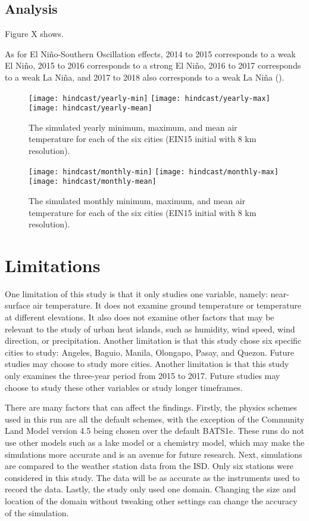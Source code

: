 	\subsection{Analysis}
		Figure X shows.
		
		As for El Niño-Southern Oscillation effects,
			2014 to 2015 corresponds to a weak El Niño,
			2015 to 2016 corresponds to a strong El Niño,
			2016 to 2017 corresponds to a weak La Niña,
			and
			2017 to 2018 also corresponds to a weak La Niña
			(\cite{Null2025}).
		
		\begin{figure}	
			\centering
			\texttt{[image: hindcast/yearly-min]}
			\texttt{[image: hindcast/yearly-max]}
			\texttt{[image: hindcast/yearly-mean]}
			\caption{
				The simulated yearly minimum, maximum, and mean air temperature for each of the six cities (EIN15 initial with 8 km resolution).
			}
			\label{fig:hindcast-yearly-stats}
		\end{figure}
	
		\begin{figure}	
			\centering
			\texttt{[image: hindcast/monthly-min]}
			\texttt{[image: hindcast/monthly-max]}
			\texttt{[image: hindcast/monthly-mean]}
			\caption{
				The simulated monthly minimum, maximum, and mean air temperature for each of the six cities (EIN15 initial with 8 km resolution).
			}
			\label{fig:hindcast-monthly-stats}
		\end{figure}

\section{Limitations}
	One limitation of this study is that it only studies one variable, namely: near-surface air temperature.
	It does not examine ground temperature or temperature at different elevations.
	It also does not examine other factors that may be relevant to the study of urban heat islands, such as humidity, wind speed, wind direction, or precipitation. 
	Another limitation is that this study chose six specific cities to study: Angeles, Baguio, Manila, Olongapo, Pasay, and Quezon.
	Future studies may choose to study more cities.
	Another limitation is that this study only examines the three-year period from 2015 to 2017.
	Future studies may choose to study these other variables or study longer timeframes.
	
	There are many factors that can affect the findings. 
	Firstly, the physics schemes used in this run are all the default schemes, with the exception of the Community Land Model version 4.5 being chosen over the default BATS1e. 
	These runs do not use other models such as a lake model or a chemistry model, which may make the simulations more accurate and is an avenue for future research.
	Next, simulations are compared to the weather station data from the ISD.
	Only six stations were considered in this study.
	The data will be as accurate as the instruments used to record the data.
	Lastly, the study only used one domain.
	Changing the size and location of the domain without tweaking other settings can change the accuracy of the simulation.